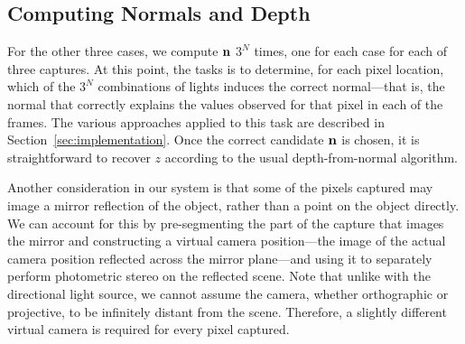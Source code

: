 \subsection{Computing Normals and Depth}
For the other three cases, we compute $\mathbf{n}$ $3^N$ times, one for each case
for each of three captures. At this point, the tasks is to determine, for each
pixel location, which of the $3^N$ combinations of lights induces the correct
normal---that is, the normal that correctly explains the values observed for
that pixel in each of the frames. The various approaches applied to this task
are described in Section~\ref{sec:implementation}. Once the correct candidate
$\mathbf{n}$ is chosen, it is straightforward to recover $z$ according to the usual
depth-from-normal algorithm.

Another consideration in our system is that some of the pixels captured may
image a mirror reflection of the object, rather than a point on the object
directly. We can account for this by pre-segmenting the part of the capture
that images the mirror and constructing a virtual camera position---the image
of the actual camera position reflected across the mirror plane---and using it
to separately perform photometric stereo on the reflected scene. Note that
unlike with the directional light source, we cannot assume the camera, whether
orthographic or projective, to be infinitely distant from the scene. Therefore,
a slightly different virtual camera is required for every pixel captured.

